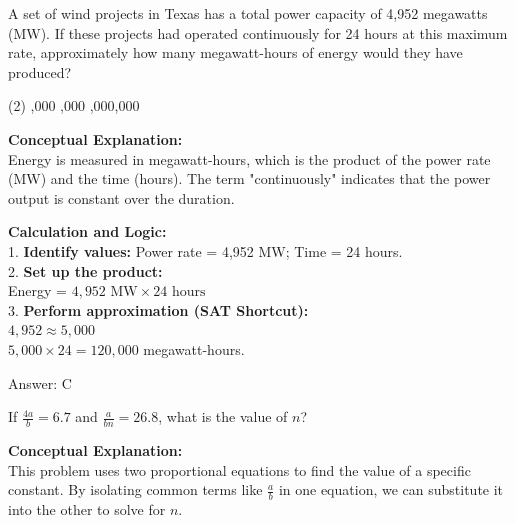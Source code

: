 \documentclass[11pt,paper=a4,answers]{exam}
\begin{document}
\begin{questions}
\vspace{60pt}

\question
A set of wind projects in Texas has a total power capacity of 4,952 megawatts (MW). If these projects had operated continuously for 24 hours at this maximum rate, approximately how many megawatt-hours of energy would they have produced?
\begin{tasks}(2)
    ,000
    ,000
    ,000,000
\end{tasks}

\begin{solution}
\textbf{Conceptual Explanation:} \\
Energy is measured in megawatt-hours, which is the product of the power rate (MW) and the time (hours). The term "continuously" indicates that the power output is constant over the duration.

\vspace{30pt}

\textbf{Calculation and Logic:} \\
1. \textbf{Identify values:} Power rate = 4,952 MW; Time = 24 hours. \\
2. \textbf{Set up the product:} \\
Energy = $4,952 \text{ MW} \times 24 \text{ hours}$ \\
3. \textbf{Perform approximation (SAT Shortcut):} \\
$4,952 \approx 5,000$ \\
$5,000 \times 24 = 120,000$ megawatt-hours.

\vspace{30pt}

Answer: \colorbox{yellow!100}{C}
\end{solution}

\vspace{60pt}

\question
If $\frac{4a}{b} = 6.7$ and $\frac{a}{bn} = 26.8$, what is the value of $n$?

\begin{solution}
\textbf{Conceptual Explanation:} \\
This problem uses two proportional equations to find the value of a specific constant. By isolating common terms like $\frac{a}{b}$ in one equation, we can substitute it into the other to solve for $n$.


\end{solution}
\end{questions}
\end{document}
